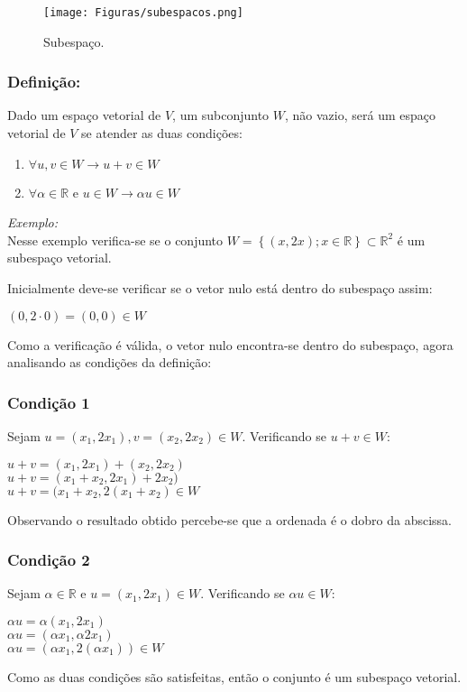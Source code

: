 {{\begin{figure}[!hb]
  \centering \texttt{[image: Figuras/subespacos.png]}
  \caption{Subespaço.}
  \label{chave_para_refencia_cruzada}
\end{figure}

\subsubsection{Definição:}
\noindent Dado um espaço vetorial de $V$, um subconjunto $W$, não vazio, será um espaço vetorial de $V$ se atender as duas condições:

\begin{enumerate}
    \item $\forall u, v \in W \rightarrow u + v \in W$
    \item $\forall \alpha \in \mathbb{R}$ e $u \in W \rightarrow \alpha u \in W$
\end{enumerate}

\textit{Exemplo:}\\
Nesse exemplo verifica-se se o conjunto $W = \left \{ (x, 2x) ; x \in \mathbb{R} \right \} \subset \mathbb{R}^2$ é um subespaço vetorial.

Inicialmente deve-se verificar se o vetor nulo está dentro do subespaço assim:
\begin{center}
    $(0, 2\cdot0) = (0,0) \in W$    
\end{center}
Como a verificação é válida, o vetor nulo encontra-se dentro do subespaço, agora analisando as condições da definição:

\subsubsection{Condição 1}
\noindent Sejam $u = (x_{1}, 2x_{1}), v = (x_{2}, 2x_{2}) \in W$. Verificando se $u + v \in W$:
\begin{center}
    $u + v = (x_{1}, 2x_{1}) + (x_{2}, 2x_{2})$\\
    $u + v = (x_{1} + x_{2}, 2x_{1}) + 2x_{2})$\\
    $u + v = (x_{1} + x_{2}, 2(x_{1} + x_{2}) \in W$\\
\end{center}
Observando o resultado obtido percebe-se que a ordenada é o dobro da abscissa.

\subsubsection{Condição 2}
\noindent Sejam $\alpha \in \mathbb{R}$ e $u = (x_{1}, 2x_{1}) \in W$. Verificando se $\alpha u \in W$:
\begin{center}
    $\alpha u = \alpha(x_{1}, 2x_{1})$\\
    $\alpha u = (\alpha x_{1}, \alpha 2x_{1})$\\
    $\alpha u = (\alpha x_{1}, 2(\alpha x_{1})) \in W$\\
\end{center}
Como as duas condições são satisfeitas, então o conjunto é um subespaço vetorial.


}}
